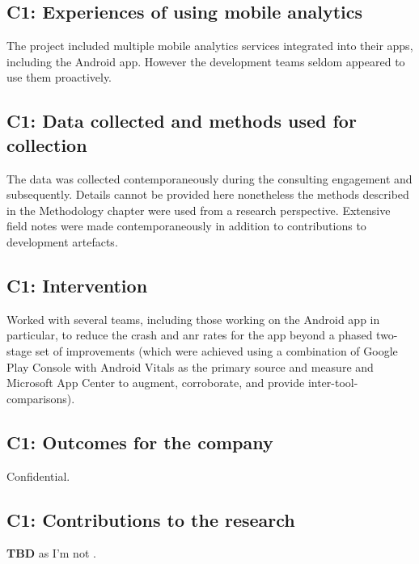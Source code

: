 \subsection{C1: Experiences of using mobile analytics}
The project included multiple mobile analytics services integrated into their apps, including the Android app. However the development teams seldom appeared to use them proactively. 


\subsection{C1: Data collected and methods used for collection}
The data was collected contemporaneously during the consulting engagement and subsequently. Details cannot be provided here nonetheless the methods described in the Methodology chapter were used from a research perspective. Extensive field notes were made contemporaneously in addition to contributions to development artefacts. 

\subsection{C1: Intervention}
Worked with several teams, including those working on the Android app in particular, to reduce the crash and \acrshort{anr} rates for the app beyond a phased two-stage set of improvements (which were achieved using a combination of Google Play Console with Android Vitals as the primary source and measure and Microsoft App Center to augment, corroborate, and provide inter-tool-comparisons).

\subsection{C1: Outcomes for the company}
Confidential.

\subsection{C1: Contributions to the research}
\textbf{TBD} as I'm not .

